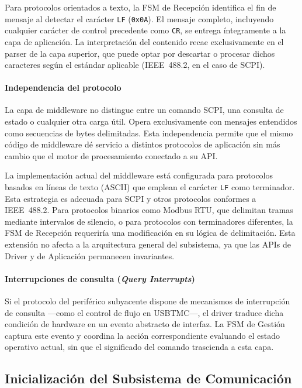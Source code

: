 Para protocolos orientados a texto, la FSM de Recepción identifica el fin de mensaje al detectar el carácter \texttt{LF} (\texttt{0x0A}). El mensaje completo, incluyendo cualquier carácter de control precedente como \texttt{CR}, se entrega íntegramente a la capa de aplicación. La interpretación del contenido recae exclusivamente en el parser de la capa superior, que puede optar por descartar o procesar dichos caracteres según el estándar aplicable (IEEE~488.2, en el caso de SCPI).

\paragraph{Independencia del protocolo}

La capa de middleware no distingue entre un comando SCPI, una consulta de estado o cualquier otra carga útil. Opera exclusivamente con mensajes entendidos como secuencias de bytes delimitadas. Esta independencia permite que el mismo código de middleware dé servicio a distintos protocolos de aplicación sin más cambio que el motor de procesamiento conectado a su API.

La implementación actual del middleware está configurada para protocolos basados en líneas de texto (ASCII) que emplean el carácter \texttt{LF} como terminador. Esta estrategia es adecuada para SCPI y otros protocolos conformes a IEEE~488.2. Para protocolos binarios como Modbus RTU, que delimitan tramas mediante intervalos de silencio, o para protocolos con terminadores diferentes, la FSM de Recepción requeriría una modificación en su lógica de delimitación. Esta extensión no afecta a la arquitectura general del subsistema, ya que las APIs de Driver y de Aplicación permanecen invariantes.

\paragraph{Interrupciones de consulta (\textit{Query Interrupts})}

Si el protocolo del periférico subyacente dispone de mecanismos de interrupción de consulta —como el control de flujo en USBTMC—, el driver traduce dicha condición de hardware en un evento abstracto de interfaz. La FSM de Gestión captura este evento y coordina la acción correspondiente evaluando el estado operativo actual, sin que el significado del comando trascienda a esta capa.

\subsection{Inicialización del Subsistema de Comunicación}
\label{subsec:inicializacion}

